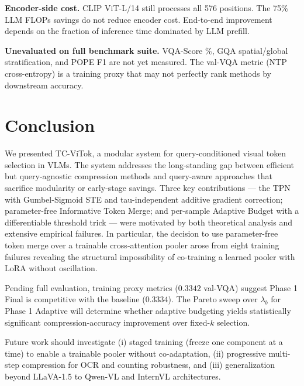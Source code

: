 \documentclass{article}
\begin{document}
\textbf{Encoder-side cost.} CLIP ViT-L/14 still processes all 576 positions.
The 75\% LLM FLOPs savings do not reduce encoder cost.
End-to-end improvement depends on the fraction of inference time dominated by
LLM prefill.

\textbf{Unevaluated on full benchmark suite.} VQA-Score \%, GQA spatial/global
stratification, and POPE F1 are not yet measured.
The val-VQA metric (NTP cross-entropy) is a training proxy that may not perfectly
rank methods by downstream accuracy.

\section{Conclusion}
\label{sec:conclusion}

We presented TC-ViTok, a modular system for query-conditioned visual token selection
in VLMs.
The system addresses the long-standing gap between efficient but query-agnostic
compression methods and query-aware approaches that sacrifice modularity or
early-stage savings.
Three key contributions — the TPN with Gumbel-Sigmoid STE and tau-independent
additive gradient correction; parameter-free Informative Token Merge; and
per-sample Adaptive Budget with a differentiable threshold trick — were motivated
by both theoretical analysis and extensive empirical failures.
In particular, the decision to use parameter-free token merge over a trainable
cross-attention pooler arose from eight training failures revealing the structural
impossibility of co-training a learned pooler with LoRA without oscillation.

Pending full evaluation, training proxy metrics ($0.3342$ val-VQA) suggest Phase 1
Final is competitive with the baseline ($0.3334$).
The Pareto sweep over $\lambda_b$ for Phase 1 Adaptive will determine whether
adaptive budgeting yields statistically significant compression-accuracy improvement
over fixed-$k$ selection.

Future work should investigate (i) staged training (freeze one component at a time)
to enable a trainable pooler without co-adaptation, (ii) progressive multi-step
compression for OCR and counting robustness, and (iii) generalization beyond LLaVA-1.5
to Qwen-VL and InternVL architectures.



\end{document}
